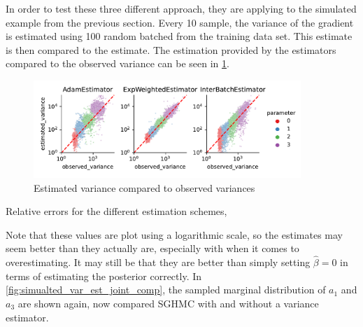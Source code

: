 In order to test these three different approach, they are applying to the simulated example from the previous section.
Every 10 sample, the variance of the gradient is estimated using 100 random batched from the training data set.
This estimate is then compared to the estimate.
The estimation provided by the estimators compared to the observed variance can be seen in \cref{fig:est_variances_simulated}.
\begin{figure}[htbp]
    \centering
    \includegraphics[width=0.9\textwidth]{Figures/simulated_sghmc_gradient_variance_estimations.pdf}
    \caption{Estimated variance compared to observed variances}
    \label{fig:est_variances_simulated}
\end{figure}
\begin{table}[htbp]
    \centering
    
    \caption{Relative errors for the different estimation schemes,}
\end{table}
Note that these values are plot using a logarithmic scale, so the estimates may seem better than they actually are, especially with when it comes to overestimating. 
It may still be that they are better than simply setting $\hat\beta=0$ in terms of estimating the posterior correctly.
In \cref{fig:simualted_var_est_joint_comp}, the sampled marginal distribution of $a_1$ and $a_3$ are shown again, now compared SGHMC with and without a variance estimator.
